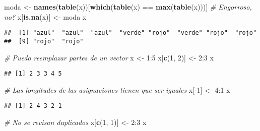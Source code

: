 \documentclass[]{article}
\newenvironment{Shaded}{\begin{snugshade}}{\end{snugshade}}
\newcommand{\KeywordTok}[1]{\textcolor[rgb]{0.13,0.29,0.53}{\textbf{{#1}}}}
\newcommand{\DecValTok}[1]{\textcolor[rgb]{0.00,0.00,0.81}{{#1}}}
\newcommand{\StringTok}[1]{\textcolor[rgb]{0.31,0.60,0.02}{{#1}}}
\newcommand{\CommentTok}[1]{\textcolor[rgb]{0.56,0.35,0.01}{\textit{{#1}}}}
\newcommand{\NormalTok}[1]{{#1}}
\begin{document}
\begin{Shaded}
\begin{Highlighting}[]
\NormalTok{moda <-}\StringTok{ }\KeywordTok{names}\NormalTok{(}\KeywordTok{table}\NormalTok{(x))[}\KeywordTok{which}\NormalTok{(}\KeywordTok{table}\NormalTok{(x) ==}\StringTok{ }\KeywordTok{max}\NormalTok{(}\KeywordTok{table}\NormalTok{(x)))] }\CommentTok{# Engorroso, no?}
\NormalTok{x[}\KeywordTok{is.na}\NormalTok{(x)] <-}\StringTok{ }\NormalTok{moda}
\NormalTok{x}
\end{Highlighting}
\end{Shaded}

\begin{verbatim}
##  [1] "azul"  "azul"  "azul"  "verde" "rojo"  "verde" "rojo"  "rojo" 
##  [9] "rojo"  "rojo"
\end{verbatim}

\begin{Shaded}
\begin{Highlighting}[]
\CommentTok{# Puedo reemplazar partes de un vector}
\NormalTok{x <-}\StringTok{ }\DecValTok{1}\NormalTok{:}\DecValTok{5}
\NormalTok{x[}\KeywordTok{c}\NormalTok{(}\DecValTok{1}\NormalTok{, }\DecValTok{2}\NormalTok{)] <-}\StringTok{ }\DecValTok{2}\NormalTok{:}\DecValTok{3}
\NormalTok{x}
\end{Highlighting}
\end{Shaded}

\begin{verbatim}
## [1] 2 3 3 4 5
\end{verbatim}

\begin{Shaded}
\begin{Highlighting}[]
\CommentTok{# Las longitudes de las asignaciones tienen que ser iguales}
\NormalTok{x[-}\DecValTok{1}\NormalTok{] <-}\StringTok{ }\DecValTok{4}\NormalTok{:}\DecValTok{1}
\NormalTok{x}
\end{Highlighting}
\end{Shaded}

\begin{verbatim}
## [1] 2 4 3 2 1
\end{verbatim}

\begin{Shaded}
\begin{Highlighting}[]
\CommentTok{# No se revisan duplicados}
\NormalTok{x[}\KeywordTok{c}\NormalTok{(}\DecValTok{1}\NormalTok{, }\DecValTok{1}\NormalTok{)] <-}\StringTok{ }\DecValTok{2}\NormalTok{:}\DecValTok{3}
\NormalTok{x}
\end{Highlighting}
\end{Shaded}
\end{document}
